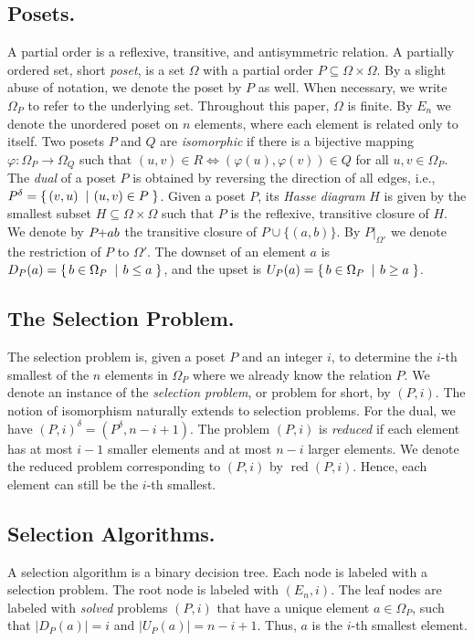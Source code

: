 \documentclass[twoside,leqno,twocolumn]{article}
\makeatletter
\newcommand{\set}[2]{\left\{\, \mathinner{#1}\vphantom{#2}\: \left|\: \vphantom{#1}\mathinner{#2} \right.\,\right\}}
\newcommand\ie{i.e\@., }
\newcommand{\sse}{\subseteq}
\newcommand{\pchild}[3]{{#1}\kern-1pt{+}{#2}{#3}}
\newcommand{\dual}[1]{{#1}^{\delta}}
\newcommand{\reduced}[1]{\operatorname{red}{#1}}
\newcommand{\less}[2]{D_{#1}(#2)}
\newcommand{\greater}[2]{U_{#1}(#2)}
\makeatother
\begin{document}
\subsection{Posets.}
A partial order is a reflexive, transitive, and antisymmetric relation.
A partially ordered set, short \emph{poset}, is a set $\Omega$ with a partial order $P \subseteq \Omega \times \Omega$.
By a slight abuse of notation, we denote the poset by $P$ as well.
When necessary, we write $\Omega_P$ to refer to the underlying set.
Throughout this paper, $\Omega$ is finite.
By $E_n$ we denote the unordered poset on $n$ elements, where each element is related only to itself.
Two posets $P$ and $Q$ are \emph{isomorphic} if there is a bijective mapping $\varphi: \Omega_P \to \Omega_Q$ such that $(u, v) \in R \iff (\varphi(u), \varphi(v)) \in Q$ for all $u, v \in \Omega_P$.
The \emph{dual} of a poset $P$ is obtained by reversing the direction of all edges, \ie $\dual{P} = \set{(v,u)}{(u,v) \in P}$.
Given a poset $P$, its \emph{Hasse diagram} $H$ is given by the smallest subset $H \sse \Omega \times \Omega$ such that $P$ is the reflexive, transitive closure of $H$.
We denote by $\pchild{P}{a}{b}$ the transitive closure of $P \cup \{(a, b)\}$.
By $P|_{\Omega'}$ we denote the restriction of $P$ to $\Omega'$.
The downset of an element $a$ is $\less{P}{a} = \set{b \in \Omega_P}{b \le a}$, and the upset is $\greater{P}{a} = \set{b \in \Omega_P}{b \ge a}$.

\subsection{The Selection Problem.}
The selection problem is, given a poset $P$ and an integer $i$, to determine the $i$-th smallest of the $n$ elements in $\Omega_P$ where we already know the relation $P$.
We denote an instance of the \emph{selection problem}, or problem for short, by $(P, i)$.
The notion of isomorphism naturally extends to selection problems.
For the dual, we have $\dual{(P, i)} = (\dual{P}, n - i + 1)$.
The problem $(P, i)$ is \emph{reduced} if each element has at most $i - 1$ smaller elements and at most $n - i$ larger elements.
We denote the reduced problem corresponding to $(P, i)$ by $\reduced{(P, i)}$.
Hence, each element can still be the $i$-th smallest.

\subsection{Selection Algorithms.}
A selection algorithm is a binary decision tree.
Each node is labeled with a selection problem.
The root node is labeled with $(E_n, i)$.
The leaf nodes are labeled with \emph{solved} problems $(P, i)$ that have a unique element $a \in \Omega_P$, such that $|\less{P}{a}| = i$ and $|\greater{P}{a}| = n - i + 1$.
Thus, $a$ is the $i$-th smallest element.
\end{document}
